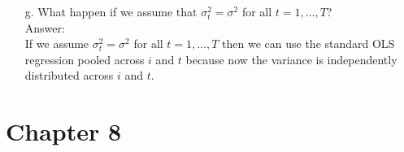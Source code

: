 \documentclass[10pt]{article}
\begin{document}
\begin{enumerate}
\begin{align*}
    &=\left(N^{-1}\sum_{i=1}^N\sum_{t=1}^T{\hat{\sigma}_t^}^{-2}\textbf{x}_{it}'\textbf{x}_{it}-o_p(1)\right)^{-1}\left(N^{-1/2}\sum_{i=1}^N\sum_{t=1}^N{\hat{\sigma}_t}^{-2}\textbf{x}_{it}'u_{it}-o_p(1)\right)+o_p(1)\\
    &=\left(N^{-1}\sum_{i=1}^N\sum_{t=1}^T{\hat{\sigma}_t^}^{-2}\textbf{x}_{it}'\textbf{x}_{it}\right)^{-1}\left(N^{-1/2}\sum_{i=1}^N\sum_{t=1}^N{\hat{\sigma}_t}^{-2}\textbf{x}_{it}'u_{it}\right)+o_p(1).
\end{align*}
Now we showed that by transforming the data $(y_{it},\textbf{x}_{it})$ to $(y_{it}/\hat{\sigma}_t,\textbf{x}_{it}/\hat{\sigma}_t)$ have the same asymptotic distribution. Note that the way we get the residuals should be different and refer to answer in point e. \qed

\item[g.] What happen if we assume that $\sigma_t^2=\sigma^2$ for all $t=1,\ldots,T$?
\\ Answer: \\
If we assume $\sigma_t^2=\sigma^2$ for all $t=1,\ldots,T$ then we can use the standard OLS regression pooled across $i$ and $t$ because now the variance is independently distributed across $i$ and $t$.
\end{enumerate}

\section*{Chapter 8}
\end{document}
